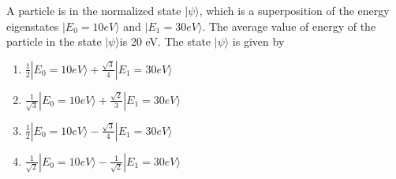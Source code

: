 \item  A particle is in the normalized state $|\psi\rangle$, which is a superposition of the energy eigenstates $|E_{0} = 10eV\rangle$ and $|E_{1} = 30eV\rangle$. The average value of energy of the particle in the state $|\psi\rangle$is 20 eV. The state $|\psi\rangle$ is given by 
\begin{multicols}{2}  
\begin{enumerate}
\item $\frac{1}{2} |E_{0} = 10eV\rangle + \frac{\sqrt{3}}{4} |E_{1} = 30eV\rangle $
\item $\frac{1}{\sqrt{3}}|E_{0} = 10eV\rangle + \frac{\sqrt{2}}{3} |E_{1} = 30eV\rangle$ 
\item $\frac{1}{2} |E_{0} = 10 eV\rangle - \frac{\sqrt{3}}{4}|E_{1} = 30 eV\rangle$ 
\item $\frac{1}{\sqrt{2}}|E_{0} = 10eV\rangle - \frac{1}{\sqrt{2}} |E_{1} = 30eV\rangle$
\end{enumerate}
\end{multicols}





